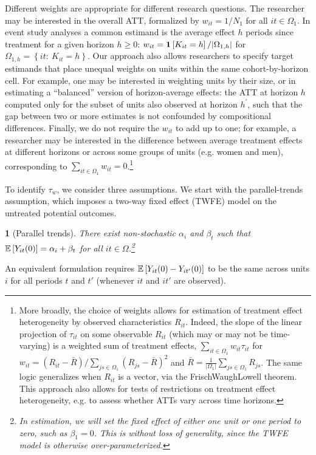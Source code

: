 \documentclass[english,11pt]{article}
\theoremstyle{plain}
\newtheorem{assumption}{\protect\assumptionname}
\theoremstyle{plain}
\theoremstyle{plain}
\theoremstyle{plain}
\providecommand{\assumptionname}{Assumption}
\begin{document}
Different weights are appropriate for different research questions.
The researcher may be interested in the overall ATT, formalized by
$w_{it}=1/N_{1}$ for all $it\in\Omega_{1}$. In event study analyses
a common estimand is the average effect $h$ periods since treatment
for a given horizon $h\ge0$: $w_{it}=\mathbf{1}\left[K_{it}=h\right]/\lvert\Omega_{1,h}\rvert$
for $\Omega_{1,h}=\left\{ it\colon\ K_{it}=h\right\} $. Our approach
also allows researchers to specify target estimands that place unequal
weights on units within the same cohort-by-horizon cell. For example,
one may be interested in weighting units by their size, or in estimating
a ``balanced'' version of horizon-average effects: the ATT at horizon
$h$ computed only for the subset of units also observed at horizon
$h^{\prime}$, such that the gap between two or more estimates is
not confounded by compositional differences. Finally, we do not require
the $w_{it}$ to add up to one; for example, a researcher may be interested
in the difference between average treatment effects at different horizons
or across some groups of units (e.g. women and men), corresponding
to $\sum_{it\in\Omega_{1}}w_{it}=0$.\footnote{More broadly, the choice of weights allows for estimation of treatment
effect heterogeneity by observed characteristics $R_{it}$. Indeed,
the slope of the linear projection of $\tau_{it}$ on some observable
$R_{it}$ (which may or may not be time-varying) is a weighted sum
of treatment effects, $\sum_{it\in\Omega_{1}}w_{it}\tau_{it}$ for
$w_{it}=\left(R_{it}-\bar{R}\right)/\sum_{js\in\Omega_{1}}(R_{js}-\bar{R})^{2}$
and $\bar{R}=\frac{1}{\lvert\Omega_{1}\rvert}\sum_{js\in\Omega_{1}}R_{js}$.
The same logic generalizes when $R_{it}$ is a vector, via the Frisch\textendash Waugh\textendash Lowell
theorem. This approach also allows for tests of restrictions on treatment
effect heterogeneity, e.g. to assess whether ATTs vary across time
horizons.}

To identify $\tau_{w}$, we consider three assumptions. We start with
the parallel-trends assumption, which imposes a two-way fixed effect
(TWFE) model on the untreated potential outcomes.
\begin{assumption}[Parallel trends]
\label{assu:A1} There exist non-stochastic $\alpha_{i}$ and $\beta_{t}$
such that $\mathbb{E}\left[Y_{it}(0)\right]=\alpha_{i}+\beta_{t}$ for all $it\in\Omega$.\footnote{In estimation, we will set the fixed effect of either one unit or
one period to zero, such as $\beta_{1}=0$. This is without loss of
generality, since the TWFE model is otherwise over-parameterized.}
\end{assumption}
An equivalent formulation requires $\mathbb{E}\left[Y_{it}(0)-Y_{it'}(0)\right]$
to be the same across units $i$ for all periods $t$ and $t'$ (whenever
$it$ and $it'$ are observed).
\end{document}
